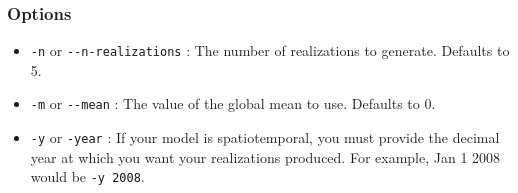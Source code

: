 


\subsubsection{Options}
\label{sec:id13}
\begin{itemize}
\item {} 
\texttt{-n} or \texttt{-{}-n-realizations} : The number of realizations to generate. Defaults to 5.

\item {} 
\texttt{-m} or \texttt{-{}-mean} : The value of the global mean to use. Defaults to 0.

\item {} 
\texttt{-y} or \texttt{-year} : If your model is spatiotemporal, you must provide the decimal year at
which you want your realizations produced. For example, Jan 1 2008 would be \texttt{-y 2008}.

\end{itemize}

